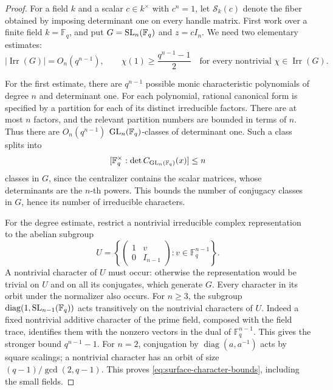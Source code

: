 \begin{proof}
For a field \(k\) and a scalar \(c\in k^\times\) with \(c^n=1\),
let \(\mathcal S_k(c)\) denote the fiber obtained by imposing
determinant one on every handle matrix.  First work over a finite
field \(k=\mathbb F_q\), and put
\(G=\operatorname{SL}_n(\mathbb F_q)\) and \(z=cI_n\).
We need two elementary estimates:
\begin{equation}\label{eq:surface-character-bounds}
 |\operatorname{Irr}(G)|=O_n(q^{n-1}),\qquad
 \chi(1)\geq\frac{q^{n-1}-1}{2}
 \quad\text{for every nontrivial }\chi\in\operatorname{Irr}(G).
\end{equation}

For the first estimate, there are \(q^{n-1}\) possible monic
characteristic polynomials of degree \(n\) and determinant one.
For each polynomial, rational canonical form is specified by a
partition for each of its distinct irreducible factors.  There are
at most \(n\) factors, and the relevant partition numbers are bounded
in terms of \(n\).  Thus there are \(O_n(q^{n-1})\)
\(\operatorname{GL}_n(\mathbb F_q)\)-classes of determinant one.
Such a class splits into
\[
 [\mathbb F_q^\times:
       \det C_{\operatorname{GL}_n(\mathbb F_q)}(x)]\leq n
\]
classes in \(G\), since the centralizer contains the scalar matrices,
whose determinants are the \(n\)-th powers.  This bounds the number
of conjugacy classes in \(G\), hence its number of irreducible characters.

For the degree estimate, restrict a nontrivial irreducible complex
representation to the abelian subgroup
\[
 U=\left\{\begin{pmatrix}1&v\\0&I_{n-1}\end{pmatrix}:
                  v\in\mathbb F_q^{n-1}\right\}.
\]
A nontrivial character of \(U\) must occur: otherwise the representation
would be trivial on \(U\) and on all its conjugates, which generate
\(G\).  Every character in its orbit under the normalizer also occurs.
For \(n\geq3\), the subgroup
\(\operatorname{diag}(1,\operatorname{SL}_{n-1}(\mathbb F_q))\) acts transitively
on the nontrivial characters of \(U\).  Indeed a fixed nontrivial
additive character of the prime field, composed with the field trace, identifies them
with the nonzero vectors in the dual of \(\mathbb F_q^{n-1}\).
This gives the stronger bound \(q^{n-1}-1\).
For \(n=2\), conjugation by \(\operatorname{diag}(a,a^{-1})\)
acts by square scalings; a nontrivial character has an orbit of size
\((q-1)/\gcd(2,q-1)\).  This proves
\eqref{eq:surface-character-bounds}, including the small fields.


\end{proof}
